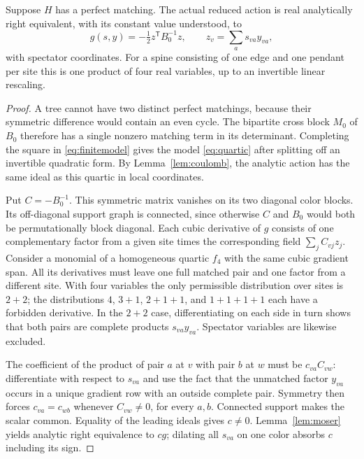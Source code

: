 \begin{theorem}\label{thm:quartic}
Suppose \(H\) has a perfect matching. The actual reduced action is real analytically right equivalent, with its constant value understood, to
\begin{equation}\label{eq:quartic}
                    g(s,y)=-\tfrac12 z^{\mathsf T}B_0^{-1}z,
           \qquad z_v=\sum_a s_{va}y_{va},
\end{equation}
with spectator coordinates. For a spine consisting of one edge and one pendant per site this is one product of four real variables, up to an invertible linear rescaling.
\end{theorem}
\begin{proof}
A tree cannot have two distinct perfect matchings, because their symmetric difference would contain an even cycle. The bipartite cross block \(M_0\) of \(B_0\) therefore has a single nonzero matching term in its determinant. Completing the square in \eqref{eq:finitemodel} gives the model \eqref{eq:quartic} after splitting off an invertible quadratic form. By Lemma~\ref{lem:coulomb}, the analytic action has the same ideal as this quartic in local coordinates.

Put \(C=-B_0^{-1}\). This symmetric matrix vanishes on its two diagonal color blocks. Its off-diagonal support graph is connected, since otherwise \(C\) and \(B_0\) would both be permutationally block diagonal. Each cubic derivative of \(g\) consists of one complementary factor from a given site times the corresponding field \(\sum_j C_{vj}z_j\). Consider a monomial of a homogeneous quartic \(f_4\) with the same cubic gradient span. All its derivatives must leave one full matched pair and one factor from a different site. With four variables the only permissible distribution over sites is \(2+2\); the distributions \(4\), \(3+1\), \(2+1+1\), and \(1+1+1+1\) each have a forbidden derivative. In the \(2+2\) case, differentiating on each side in turn shows that both pairs are complete products \(s_{va}y_{va}\). Spectator variables are likewise excluded.

The coefficient of the product of pair \(a\) at \(v\) with pair \(b\) at \(w\) must be \(c_{va}C_{vw}\): differentiate with respect to \(s_{va}\) and use the fact that the unmatched factor \(y_{va}\) occurs in a unique gradient row with an outside complete pair. Symmetry then forces \(c_{va}=c_{wb}\) whenever \(C_{vw}\ne0\), for every \(a,b\). Connected support makes the scalar common. Equality of the leading ideals gives \(c\ne0\). Lemma~\ref{lem:moser} yields analytic right equivalence to \(cg\); dilating all \(s_{va}\) on one color absorbs \(c\) including its sign.
\end{proof}
